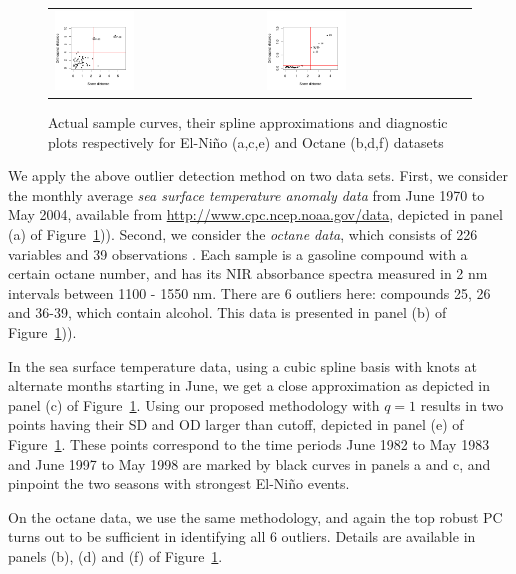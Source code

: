 \begin{figure}[t!]
\begin{center}
\begin{tabular}{ll}
\includegraphics[width=0.4\textwidth]{./Plots/Elnino_functional3} &
\includegraphics[width=0.4\textwidth]{./Plots/Octane_functional3}\\
\end{tabular}
\caption{Actual sample curves, their spline approximations and diagnostic plots respectively for El-Ni\~no (a,c,e) and Octane (b,d,f) datasets}
\label{fig:fPCAfig}
\end{center}
\end{figure}

We apply the above outlier detection method on two data sets. First, we consider the 
monthly average \textit{sea surface temperature anomaly data} 
from June 1970 to May 2004, available 
from \url{http://www.cpc.ncep.noaa.gov/data}, depicted in  panel (a) 
of Figure~\ref{fig:fPCAfig})).
Second, we consider the \textit{octane data}, which consists of 226 variables and 39 
observations \citep{ref:EsbensenetalBook94}. 
Each sample is a gasoline compound with a certain octane 
number, and has its NIR absorbance spectra measured in 2 nm intervals between 1100 - 1550 
nm. There are 6 outliers here: compounds 25, 26 and 36-39, which contain alcohol. This 
data is presented in  panel (b) of Figure~\ref{fig:fPCAfig})).

In the sea surface temperature data, using a cubic spline basis with knots at alternate 
months starting in June, we get a close approximation as depicted in 
panel (c) of Figure~\ref{fig:fPCAfig}. Using our proposed methodology with $q =1$ 
results in two points having their SD and OD larger than cutoff, depicted in  
panel (e) of Figure~\ref{fig:fPCAfig}. These points correspond to the time periods June 
1982 to May 1983 and June 1997 to May 1998 are marked by black curves in panels a and c, 
and pinpoint the two seasons with strongest El-Ni\~no events. 


On the octane data, we use the same methodology, 
 and again the top robust PC turns out to be sufficient in identifying all 6 outliers. 
 Details are available in  panels (b), (d) and (f) of Figure~\ref{fig:fPCAfig}.